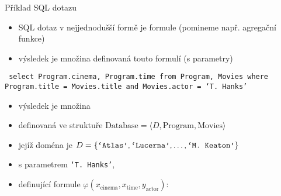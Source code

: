 \documentclass{beamer}
\begin{document}
\begin{frame}{Příklad SQL dotazu}

    \pause
    \begin{itemize}
        \item  SQL dotaz v nejjednodušší formě je formule (pomineme např. \alert{agregační funkce})\pause
        \item výsledek je množina definovaná touto formulí (s parametry) \pause
       \end{itemize}
    
    \begin{center}
        \pause
    \end{center}

    \vspace{-6pt}
        
    {\tt\footnotesize
    \alert{select} Program.cinema, Program.time \alert{from} Program, Movies \alert{where} Program.title = Movies.title  \alert{and} Movies.actor = `T. Hanks' 
    }  \pause
    
    \begin{itemize}
        \item výsledek je množina \pause
        \item definovaná ve struktuře \alert{$\text{Database}=\langle D, \mathrm{Program}, \mathrm{Movies}\rangle$}\pause
        \item jejíž doména je {\small $D=\{\text{\tt`Atlas'},\text{\tt`Lucerna'},\dots,\text{\tt`M. Keaton'}\}$}\pause
        \item s parametrem \alert{\small\tt`T. Hanks'}, \pause
        \item definující formule \alert{\small $\varphi(x_\mathrm{cinema},x_\mathrm{time},y_\mathrm{actor})$}:\pause
        
        \medskip
    \end{itemize}

\end{frame}
\end{document}
